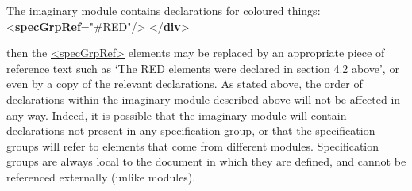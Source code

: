 \begin{shaded}
The imaginary module contains declarations for coloured things: {<\textbf{specGrpRef}\hspace*{1em}{target}="{\#RED}"/>}\mbox{}\newline 
\hspace*{1em}\mbox{}\newline 
{}\mbox{}\newline 
{</\textbf{div}>}\end{shaded}\egroup\par \noindent  then the \hyperref[TEI.specGrpRef]{<specGrpRef>} elements may be replaced by an appropriate piece of reference text such as ‘The RED elements were declared in section 4.2 above’, or even by a copy of the relevant declarations. As stated above, the order of declarations within the imaginary module described above will not be affected in any way. Indeed, it is possible that the imaginary module will contain declarations not present in any specification group, or that the specification groups will refer to elements that come from different modules. Specification groups are always local to the document in which they are defined, and cannot be referenced externally (unlike modules).
